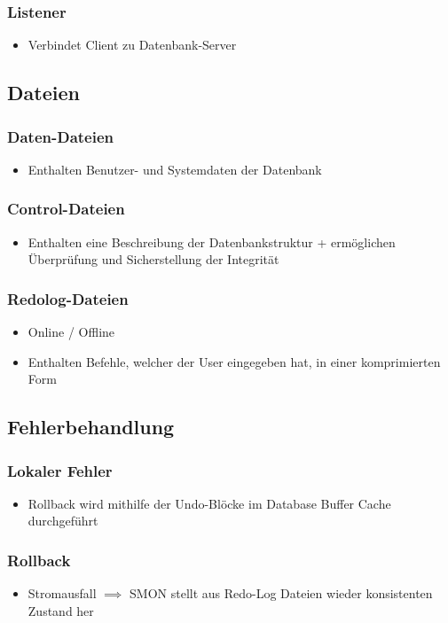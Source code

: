\subsubsection{Listener}
\begin{itemize}
    \item Verbindet Client zu Datenbank-Server
\end{itemize}

\subsection{Dateien}
\subsubsection{Daten-Dateien}
\begin{itemize}
    \item Enthalten Benutzer- und Systemdaten der Datenbank
\end{itemize}
\subsubsection{Control-Dateien}
\begin{itemize}
    \item Enthalten eine Beschreibung der Datenbankstruktur + ermöglichen Überprüfung und Sicherstellung der Integrität
\end{itemize}
\subsubsection{Redolog-Dateien}
\begin{itemize}
    \item Online / Offline
    \item Enthalten Befehle, welcher der User eingegeben hat, in einer komprimierten Form
\end{itemize}

\subsection{Fehlerbehandlung}
\subsubsection{Lokaler Fehler}
\begin{itemize}
    \item Rollback wird mithilfe der Undo-Blöcke im Database Buffer Cache durchgeführt
\end{itemize}

\subsubsection{Rollback}
\begin{itemize}
    \item Stromausfall $\implies$ SMON stellt aus Redo-Log Dateien wieder konsistenten Zustand her
\end{itemize}